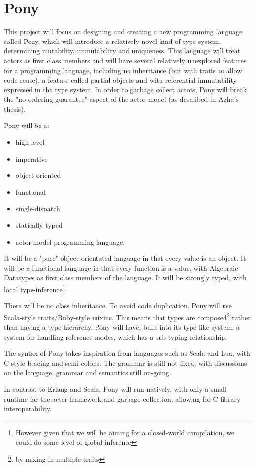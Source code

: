 \documentclass[11pt,a4paper]{report}
\begin{document}
\newpage
\chapter{Pony}
\label{chapter:pony}

This project will focus on designing and creating a new programming language called Pony, which will introduce a relatively novel kind of type system, determining mutability, immutability and uniqueness.
This language will treat actors as first class members and will have several relatively unexplored features for a programming language, including no inheritance (but with traits to allow code reuse), a feature called partial objects and with referential immutability expressed in the type system.
In order to garbage collect actors, Pony will break the "no ordering guarantee" aspect of the actor-model (as described in Agha's thesis\cite{agha1985}).

Pony will be a:
\begin{itemize}[noitemsep]
\item high level
\item imperative
\item object oriented
\item functional
\item single-dispatch
\item statically-typed
\item actor-model programming language.
\end{itemize}
It will be a "pure" object-orientated language in that every value is an object.
It will be a functional language in that every function is a value, with Algebraic Datatypes as first class members of the language.
It will be strongly typed, with local type-inference\footnote{However given that we will be aiming for a closed-world compilation, we could do some level of global inference}.

There will be no class inheritance.
To avoid code duplication, Pony will use Scala-style traits/Ruby-style mixins.
This means that types are composed\footnote{by mixing in multiple traits} rather than having a type hierarchy.
Pony will have, built into its type-like system, a system for handling reference modes, which has a sub typing relationship.

The syntax of Pony takes inspiration from languages such as Scala and Lua, with C style bracing and semi-colons.
The grammar is still not fixed, with discussions on the language, grammar and semantics still on-going.

In contrast to Erlang and Scala, Pony will run natively, with only a small runtime for the actor-framework and garbage collection, allowing for C library interoperability.
\end{document}
